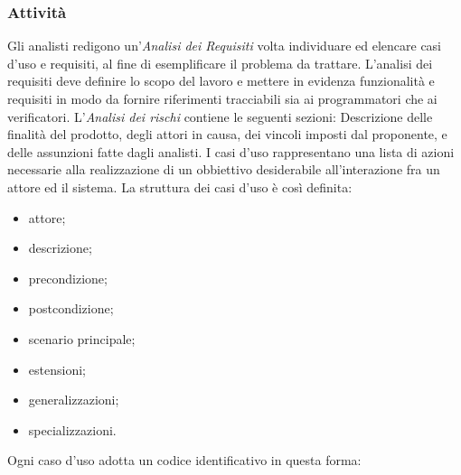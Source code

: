 		\subsubsection{Attività}
		Gli analisti redigono un'\textit{Analisi dei Requisiti} volta  individuare ed elencare casi d'uso e requisiti, al fine di esemplificare il problema da trattare.
		L'analisi dei requisiti deve definire lo scopo del lavoro e mettere in evidenza funzionalità e requisiti in modo da fornire riferimenti tracciabili sia ai programmatori che ai verificatori.
		L'\textit{Analisi dei rischi} contiene le seguenti sezioni:
		Descrizione delle finalità del prodotto, degli attori in causa, dei vincoli imposti dal proponente, e delle assunzioni fatte dagli analisti.
		I casi d'uso rappresentano una lista di azioni necessarie alla realizzazione di un obbiettivo desiderabile all'interazione fra un attore ed il sistema.
		La struttura dei casi d'uso è così definita:
		\begin{itemize}
		    \item attore;
		    \item descrizione;
		    \item precondizione;
		    \item postcondizione;
		    \item scenario principale;
		    \item estensioni;
		    \item generalizzazioni;
		    \item specializzazioni.
		\end{itemize}
		Ogni caso d'uso adotta un codice identificativo in questa forma:\\
		
